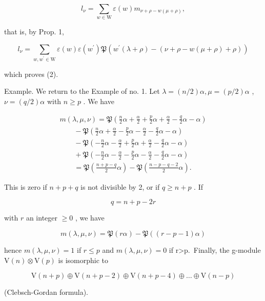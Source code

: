 \[
l _ {\nu} = \sum_ {w \in \mathrm{W}} \varepsilon (w) m _ {\nu + \rho - w (\mu + \rho)},
\]

that is, by Prop. 1,

\[
l _ {\nu} = \sum_ {w, w ^ {\prime} \in \mathrm{W}} \varepsilon (w) \varepsilon (w ^ {\prime}) \mathfrak {P} (w ^ {\prime} (\lambda + \rho) - (\nu + \rho - w (\mu + \rho) + \rho))
\]

which proves (2).

Example. We return to the Example of no. 1. Let \(\lambda = (n/2)\alpha, \mu = (p/2)\alpha\) , \(\nu = (q/2)\alpha\) with \(n \geq p\) . We have

\[
\begin{array}{l} m (\lambda , \mu , \nu) = \mathfrak {P} \left(\frac {n}{2} \alpha + \frac {\alpha}{2} + \frac {p}{2} \alpha + \frac {\alpha}{2} - \frac {q}{2} \alpha - \alpha\right) \\ \qquad - \mathfrak {P} \left(\frac {n}{2} \alpha + \frac {\alpha}{2} - \frac {p}{2} \alpha - \frac {\alpha}{2} - \frac {q}{2} \alpha - \alpha\right) \\ \qquad - \mathfrak {P} \left(- \frac {n}{2} \alpha - \frac {\alpha}{2} + \frac {p}{2} \alpha + \frac {\alpha}{2} - \frac {q}{2} \alpha - \alpha\right) \\ \qquad + \mathfrak {P} \left(- \frac {n}{2} \alpha - \frac {\alpha}{2} - \frac {p}{2} \alpha - \frac {\alpha}{2} - \frac {q}{2} \alpha - \alpha\right) \\ \qquad = \mathfrak {P} \left(\frac {n + p - q}{2} \alpha\right) - \mathfrak {P} \left(\frac {n - p - q - 2}{2} \alpha\right). \end{array}
\]

This is zero if \(n + p + q\) is not divisible by 2, or if \(q \geq n + p\) . If

\[
q = n + p - 2 r
\]

with \(r\) an integer \(\geq 0\) , we have

\[
m (\lambda , \mu , \nu) = \mathfrak {P} (r \alpha) - \mathfrak {P} ((r - p - 1) \alpha)
\]

hence \(m(\lambda,\mu,\nu)=1\) if \(r\leq p\) and \(m(\lambda,\mu,\nu)=0\) if r\textgreater p.~Finally, the g-module \(\mathrm{V}(n)\otimes\mathrm{V}(p)\) is isomorphic to

\[
\mathrm{V} (n + p) \oplus \mathrm{V} (n + p - 2) \oplus \mathrm{V} (n + p - 4) \oplus \dots \oplus \mathrm{V} (n - p)
\]

(Clebsch-Gordan formula).

